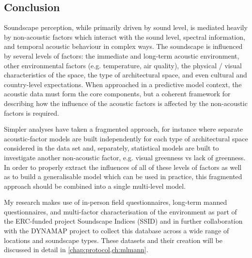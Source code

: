 
\subsection{Conclusion}
Soundscape perception, while primarily driven by sound level, is mediated heavily by non-acoustic factors which interact with the sound level, spectral information, and temporal acoustic behaviour in complex ways. The soundscape is influenced by several levels of factors: the immediate and long-term acoustic environment, other environmental factors (e.g. temperature, air quality), the physical / visual characteristics of the space, the type of architectural space, and even cultural and country-level expectations. When approached in a predictive model context, the acoustic data must form the core components, but a coherent framework for describing how the influence of the acoustic factors is affected by the non-acoustic factors is required.

Simpler analyses have taken a fragmented approach, for instance where separate acoustic-factor models are built independently for each type of architectural space considered in the data set and, separately, statistical models are built to investigate another non-acoustic factor, e.g. visual greenness vs lack of greenness. In order to properly extract the influences of all of these levels of factors as well as to build a generalisable model which can be used in practice, this fragmented approach should be combined into a single multi-level model.

My research makes use of in-person field questionnaires, long-term manned questionnaires, and multi-factor characterisation of the environment as part of the ERC-funded project Soundscape Indices (SSID) and in further collaboration with the DYNAMAP project to collect this database across a wide range of locations and soundscape types. These datasets and their creation will be discussed in detail in \cref{chap:protocol,ch:mlmann}.

